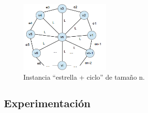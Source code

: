 \begin{figure}[H]
  \centering
  \includegraphics[width=0.4\textwidth]{ej3/greedy_graph_star+cicle_example2.png}
  \caption{Instancia ``estrella + ciclo'' de tamaño n.}
\end{figure}
  
\subsection{Experimentaci\'on}
